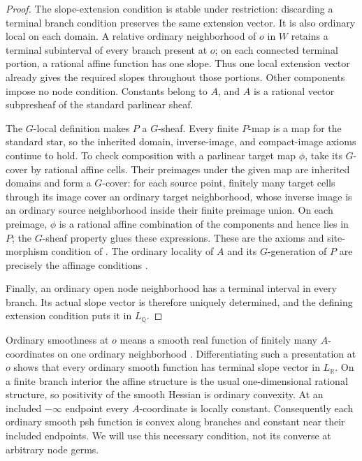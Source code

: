 \documentclass[11pt,a4paper]{amsart}
\begin{document}
\begin{proof}
The slope-extension condition is stable under restriction: discarding a terminal branch condition preserves the same extension vector. It is also ordinary local on each domain. A relative ordinary neighborhood of $o$ in $W$ retains a terminal subinterval of every branch present at $o$; on each connected terminal portion, a rational affine function has one slope. Thus one local extension vector already gives the required slopes throughout those portions. Other components impose no node condition. Constants belong to $A$, and $A$ is a rational vector subpresheaf of the standard parlinear sheaf.

The $G$-local definition makes $P$ a $G$-sheaf. Every finite $P$-map is a map for the standard star, so the inherited domain, inverse-image, and compact-image axioms continue to hold. To check composition with a parlinear target map $\phi$, take its $G$-cover by rational affine cells. Their preimages under the given map are inherited domains and form a $G$-cover: for each source point, finitely many target cells through its image cover an ordinary target neighborhood, whose inverse image is an ordinary source neighborhood inside their finite preimage union. On each preimage, $\phi$ is a rational affine combination of the components and hence lies in $P$; the $G$-sheaf property glues these expressions. These are the axioms and site-morphism condition of \cite[\S\S3.1.2--3.1.4]{CLD12}. The ordinary locality of $A$ and its $G$-generation of $P$ are precisely the affinage conditions \cite[\S\S6.1.1--6.1.2]{CLD12}.

Finally, an ordinary open node neighborhood has a terminal interval in every branch. Its actual slope vector is therefore uniquely determined, and the defining extension condition puts it in $L_{\mathbb Q}$.
\end{proof}

Ordinary smoothness at $o$ means a smooth real function of finitely many $A$-coordinates on one ordinary neighborhood \cite[Definition~6.2.1]{CLD12}. Differentiating such a presentation at $o$ shows that every ordinary smooth function has terminal slope vector in $L_{\mathbb R}$. On a finite branch interior the affine structure is the usual one-dimensional rational structure, so positivity of the smooth Hessian is ordinary convexity. At an included $-\infty$ endpoint every $A$-coordinate is locally constant. Consequently each ordinary smooth psh function is convex along branches and constant near their included endpoints. We will use this necessary condition, not its converse at arbitrary node germs.
\end{document}
